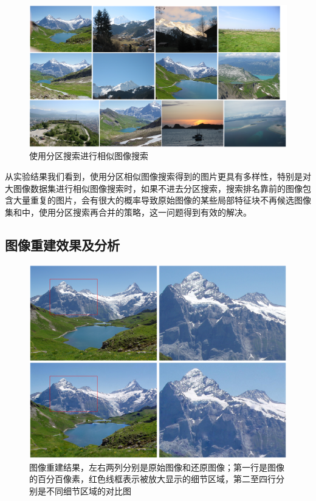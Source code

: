 \begin{figure}
\centering\includegraphics[width=15cm]{imgs/ch4/candidates2}
\caption{使用分区搜索进行相似图像搜索}
\label{fig:candidates2}
\end{figure}
从实验结果我们看到，使用分区相似图像搜索得到的图片更具有多样性，特别是对大图像数据集进行相似图像搜索时，如果不进去分区搜索，搜索排名靠前的图像包含大量重复的图片，会有很大的概率导致原始图像的某些局部特征块不再候选图像集和中，使用分区搜索再合并的策略，这一问题得到有效的解决。

\subsection{图像重建效果及分析}

\begin{figure}
\centering\includegraphics[width=15cm]{imgs/ch4/detail_result}
\caption{图像重建结果，左右两列分别是原始图像和还原图像；第一行是图像的百分百像素，红色线框表示被放大显示的细节区域，第二至四行分别是不同细节区域的对比图}
\label{fig:detail_result}
\end{figure}

